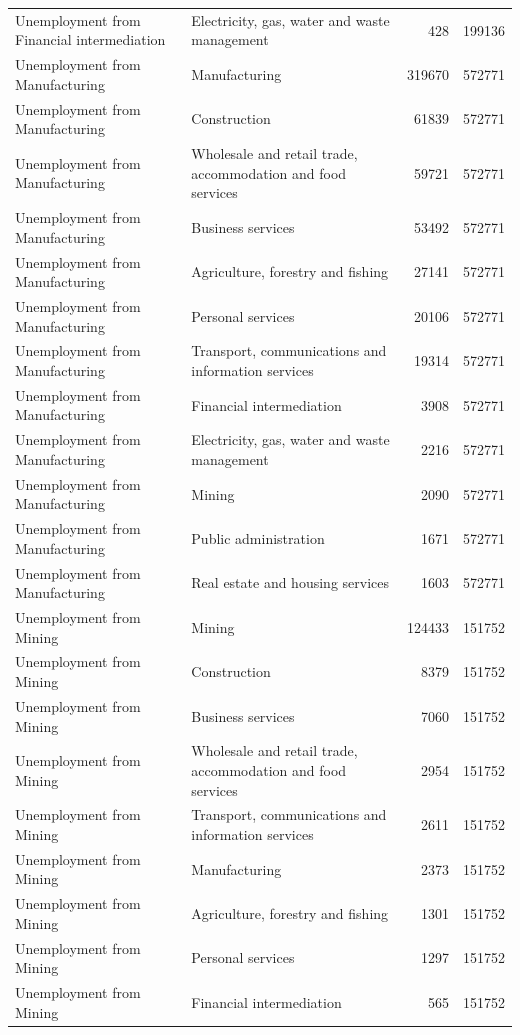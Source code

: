 \begin{longtable}{llrr}
Unemployment from Financial intermediation & Electricity, gas, water and waste management & 428 & 199136 \\
Unemployment from Manufacturing & Manufacturing & 319670 & 572771 \\
Unemployment from Manufacturing & Construction & 61839 & 572771 \\
Unemployment from Manufacturing & Wholesale and retail trade, accommodation and food services & 59721 & 572771 \\
Unemployment from Manufacturing & Business services & 53492 & 572771 \\
Unemployment from Manufacturing & Agriculture, forestry and fishing & 27141 & 572771 \\
Unemployment from Manufacturing & Personal services & 20106 & 572771 \\
Unemployment from Manufacturing & Transport, communications and information services & 19314 & 572771 \\
Unemployment from Manufacturing & Financial intermediation & 3908 & 572771 \\
Unemployment from Manufacturing & Electricity, gas, water and waste management & 2216 & 572771 \\
Unemployment from Manufacturing & Mining & 2090 & 572771 \\
Unemployment from Manufacturing & Public administration & 1671 & 572771 \\
Unemployment from Manufacturing & Real estate and housing services & 1603 & 572771 \\
Unemployment from Mining & Mining & 124433 & 151752 \\
Unemployment from Mining & Construction & 8379 & 151752 \\
Unemployment from Mining & Business services & 7060 & 151752 \\
Unemployment from Mining & Wholesale and retail trade, accommodation and food services & 2954 & 151752 \\
Unemployment from Mining & Transport, communications and information services & 2611 & 151752 \\
Unemployment from Mining & Manufacturing & 2373 & 151752 \\
Unemployment from Mining & Agriculture, forestry and fishing & 1301 & 151752 \\
Unemployment from Mining & Personal services & 1297 & 151752 \\
Unemployment from Mining & Financial intermediation & 565 & 151752 \\

\end{longtable}
